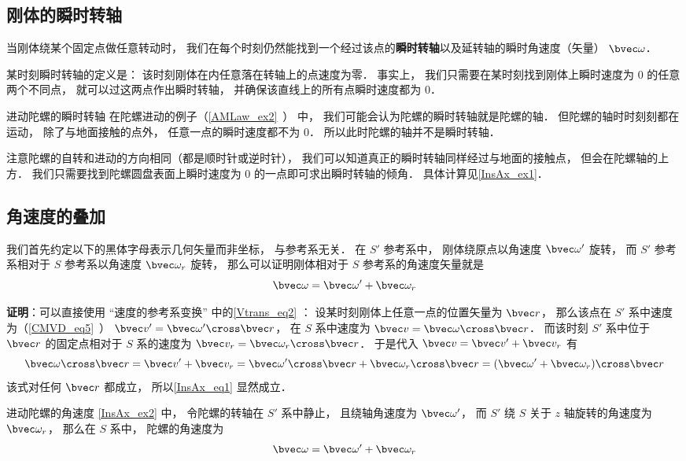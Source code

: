 


\subsection{刚体的瞬时转轴}
当刚体绕某个固定点做任意转动时， 我们在每个时刻仍然能找到一个经过该点的\textbf{瞬时转轴}以及延转轴的瞬时角速度（矢量） $\bvec \omega$．

某时刻瞬时转轴的定义是： 该时刻刚体在内任意落在转轴上的点速度为零． 事实上， 我们只需要在某时刻找到刚体上瞬时速度为 0 的任意两个不同点， 就可以过这两点作出瞬时转轴， 并确保该直线上的所有点瞬时速度都为 0．

\begin{example}{进动陀螺的瞬时转轴}\label{InsAx_ex2}
在陀螺进动的例子（\autoref{AMLaw_ex2}~） 中， 我们可能会认为陀螺的瞬时转轴就是陀螺的轴． 但陀螺的轴时时刻刻都在运动， 除了与地面接触的点外， 任意一点的瞬时速度都不为 0． 所以此时陀螺的轴并不是瞬时转轴．

注意陀螺的自转和进动的方向相同（都是顺时针或逆时针）， 我们可以知道真正的瞬时转轴同样经过与地面的接触点， 但会在陀螺轴的上方． 我们只需要找到陀螺圆盘表面上瞬时速度为 0 的一点即可求出瞬时转轴的倾角． 具体计算见\autoref{InsAx_ex1}．
\end{example}

\subsection{角速度的叠加}

我们首先约定以下的黑体字母表示几何矢量而非坐标， 与参考系无关． 在 $S'$ 参考系中， 刚体绕原点以角速度 $\bvec \omega'$ 旋转， 而 $S'$ 参考系相对于 $S$ 参考系以角速度 $\bvec \omega_r$ 旋转， 那么可以证明刚体相对于 $S$ 参考系的角速度矢量就是
\begin{equation}\label{InsAx_eq1}
\bvec \omega = \bvec \omega' + \bvec \omega_r
\end{equation}

\textbf{证明}：可以直接使用 “速度的参考系变换” 中的\autoref{Vtrans_eq2} ： 设某时刻刚体上任意一点的位置矢量为 $\bvec r$， 那么该点在 $S'$ 系中速度为（\autoref{CMVD_eq5}~） $\bvec v' = \bvec\omega'\cross\bvec r$， 在 $S$ 系中速度为 $\bvec v = \bvec\omega\cross\bvec r$． 而该时刻 $S'$ 系中位于 $\bvec r$ 的固定点相对于 $S$ 系的速度为 $\bvec v_r = \bvec\omega_r\cross\bvec r$． 于是代入 $\bvec v = \bvec v' + \bvec v_r$ 有
\begin{equation}
\bvec\omega\cross\bvec r = \bvec v' + \bvec v_r = \bvec\omega'\cross\bvec r + \bvec\omega_r\cross\bvec r
= (\bvec\omega' + \bvec\omega_r)\cross\bvec r
\end{equation}
该式对任何 $\bvec r$ 都成立， 所以\autoref{InsAx_eq1} 显然成立．

\begin{example}{进动陀螺的角速度}\label{InsAx_ex1}
\autoref{InsAx_ex2} 中， 令陀螺的转轴在 $S'$ 系中静止， 且绕轴角速度为 $\bvec \omega'$， 而 $S'$ 绕 $S$ 关于 $z$ 轴旋转的角速度为 $\bvec \omega_r$， 那么在 $S$ 系中， 陀螺的角速度为
\begin{equation}
\bvec \omega = \bvec \omega' + \bvec \omega_r
\end{equation}
\end{example}

